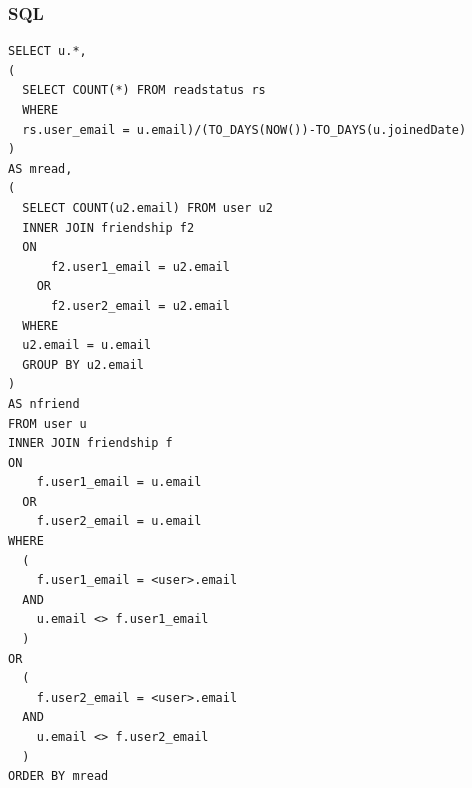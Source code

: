\documentclass[a4paper,10pt]{article}
\begin{document}
\subsubsection{SQL}
\begin{lstlisting}
SELECT u.*,
(
  SELECT COUNT(*) FROM readstatus rs 
  WHERE 
  rs.user_email = u.email)/(TO_DAYS(NOW())-TO_DAYS(u.joinedDate)
) 
AS mread,
(
  SELECT COUNT(u2.email) FROM user u2
  INNER JOIN friendship f2 
  ON 
      f2.user1_email = u2.email 
    OR 
      f2.user2_email = u2.email
  WHERE 
  u2.email = u.email 
  GROUP BY u2.email
) 
AS nfriend
FROM user u
INNER JOIN friendship f 
ON 
    f.user1_email = u.email 
  OR 
    f.user2_email = u.email
WHERE 
  (
    f.user1_email = <user>.email 
  AND 
    u.email <> f.user1_email
  ) 
OR 
  (
    f.user2_email = <user>.email 
  AND 
    u.email <> f.user2_email
  )
ORDER BY mread
\end{lstlisting}
		
\end{document}
